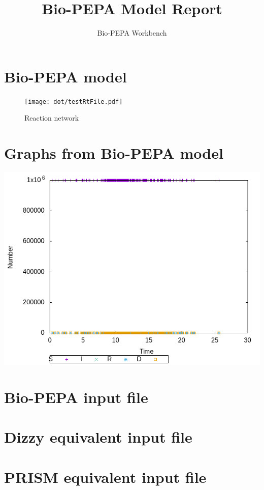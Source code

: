 \documentclass{llncs}
\title{Bio-PEPA Model Report}
\author{Bio-PEPA Workbench}
\institute{\today}
\begin{document}
\maketitle
\section{Bio-PEPA model}

\begin{figure}[htbp]
\begin{center}
\texttt{[image: dot/testRtFile.pdf]}
\caption{Reaction network}
\end{center}
\end{figure}
\newpage
\section{Graphs from Bio-PEPA model}
\includegraphics[scale=0.5]{png/testRtFile001_stochkit_results_0}
\appendix
\newpage
\section{Bio-PEPA input file}

\newpage
\section{Dizzy equivalent input file}

\newpage
\section{PRISM equivalent input file}

\end{document}

